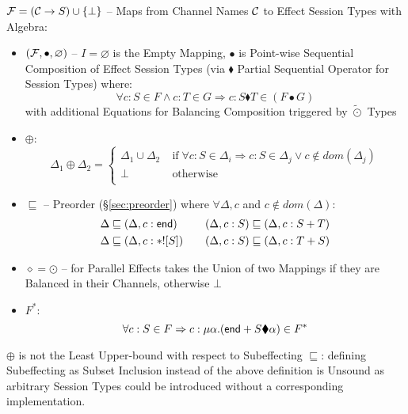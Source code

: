 $\mathcal{F} = (\mathcal{C} \rightarrow S) \cup \{\bot\}$ -- Maps from
Channel Names $\mathcal{C}$ to Effect Session Types with Algebra:
\begin{itemize}
  \item $(\mathcal{F},\bullet,\varnothing)$ -- $I = \varnothing$ is the
    Empty Mapping, $\bullet$ is Point-wise Sequential Composition of
    Effect Session Types (via $\blacklozenge$ Partial Sequential
    Operator for Session Types) where:
    \[
      \forall c:S \in F \wedge c:T \in G
        \Rightarrow c:S \blacklozenge T \in (F \bullet G)
    \]
    with additional Equations for Balancing Composition triggered by
    $\tilde{\odot}$ Types %
  \item $\oplus$:
    \[
      \Delta_1 \oplus \Delta_2 =
      \begin{cases}
        \Delta_1 \cup \Delta_2 & \;\text{if}\;
          \forall c:S \in \Delta_i
          \Rightarrow c:S \in \Delta_j \vee c \notin dom(\Delta_j) \\
        \bot & \;\text{otherwise} \\
      \end{cases}
    \]
  \item $\sqsubseteq$ -- Preorder (\S\ref{sec:preorder}) where
    $\forall\Delta,c$ and $c \notin dom(\Delta)$:
    \[\begin{aligned}
        \Delta &\sqsubseteq (\Delta,c:\mathsf{end}) \\
        \Delta &\sqsubseteq (\Delta,c:*![S]) \\
      \end{aligned}
      \quad\quad
      \begin{aligned}
        (\Delta,c:S) &\sqsubseteq (\Delta,c:S + T) \\
        (\Delta,c:S) &\sqsubseteq (\Delta,c:T + S) \\
    \end{aligned}\]
  \item $\diamond = \odot$ -- for Parallel Effects takes the Union of
    two Mappings if they are Balanced in their Channels, otherwise
    $\bot$ %
  \item $F^*$:
    \[
      \forall c:S \in F
        \Rightarrow c:\mu\alpha.(\mathsf{end} + S \blacklozenge \alpha) \in F^*
    \]
\end{itemize}

\fist $\oplus$ is not the Least Upper-bound with respect to
Subeffecting $\sqsubseteq$: defining Subeffecting as Subset Inclusion
instead of the above definition is Unsound as arbitrary Session Types
could be introduced without a corresponding implementation.


